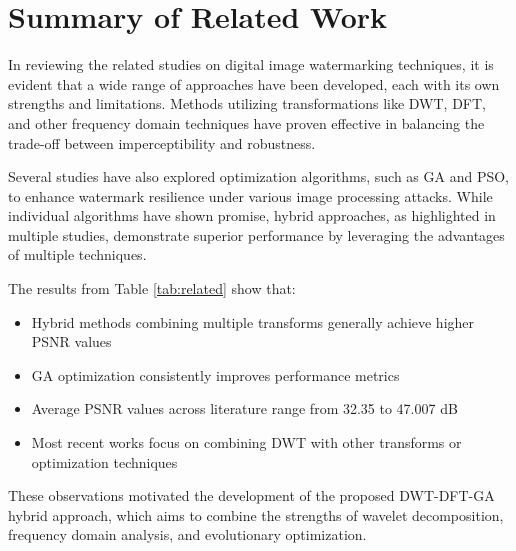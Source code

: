 \section{Summary of Related Work}

In reviewing the related studies on digital image watermarking techniques, it is evident that a wide range of approaches have been developed, each with its own strengths and limitations. Methods utilizing transformations like DWT, DFT, and other frequency domain techniques have proven effective in balancing the trade-off between imperceptibility and robustness. 

Several studies have also explored optimization algorithms, such as GA and PSO, to enhance watermark resilience under various image processing attacks. While individual algorithms have shown promise, hybrid approaches, as highlighted in multiple studies, demonstrate superior performance by leveraging the advantages of multiple techniques.

The results from Table \ref{tab:related} show that:
\begin{itemize}
    \item Hybrid methods combining multiple transforms generally achieve higher PSNR values
    \item GA optimization consistently improves performance metrics
    \item Average PSNR values across literature range from 32.35 to 47.007 dB
    \item Most recent works focus on combining DWT with other transforms or optimization techniques
\end{itemize}

These observations motivated the development of the proposed DWT-DFT-GA hybrid approach, which aims to combine the strengths of wavelet decomposition, frequency domain analysis, and evolutionary optimization.
